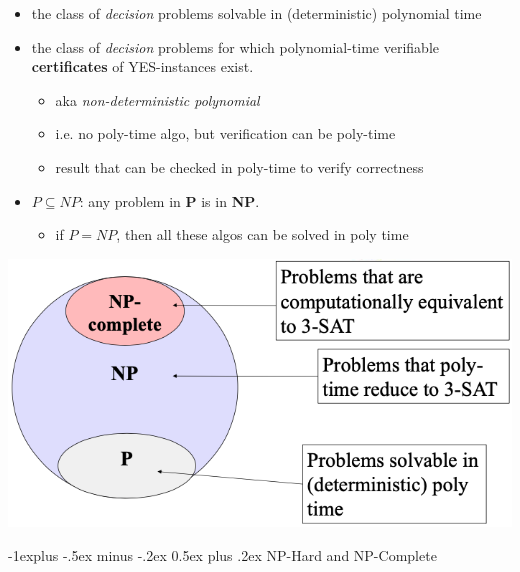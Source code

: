 \documentclass[10pt, landscape]{article}
\makeatletter
\renewcommand{\subsection}{\@startsection{subsection}{2}{0mm}%
  {-1explus -.5ex minus -.2ex}%
  {0.5ex plus .2ex}%
{\normalfont\normalsize\bfseries}}
\makeatother
\begin{document}
\begin{multicols*}{4}
  \begin{itemize}
    \item {} the class of \textit{decision} problems solvable in (deterministic) polynomial time
    \item {} the class of \textit{decision} problems for which polynomial-time verifiable \textbf{certificates} of YES-instances exist.
      \begin{itemize}
        \item aka \textit{non-deterministic polynomial}
        \item i.e. no poly-time algo, but verification can be poly-time
        \item {} result that can be checked in poly-time to verify correctness
      \end{itemize}
    \item $P \subseteq NP$: any problem in \textbf{P} is in \textbf{NP}.
      \begin{itemize}
        \item if $P=NP$, then all these algos can be solved in poly time
      \end{itemize}
  \end{itemize}

  \includegraphics[width=0.95\linewidth]{cs3230-p-np.png} 

  \subsection{NP-Hard and NP-Complete}


\end{multicols*}
\end{document}
